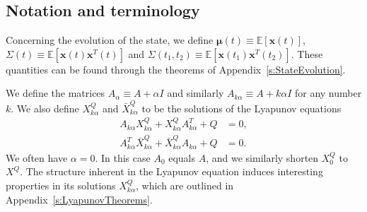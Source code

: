\documentclass[twocolumn]{autart}
\newcommand{\ve}[1]{{\boldsymbol{#1}}} \newcommand{\tr}{\mbox{tr}} \newcommand{\ex}{\mathds{E}} \newcommand{\va}{\mathds{V}}
\begin{document}
\subsection{Notation and terminology} \label{ss:NotationAndTerminology}

Concerning the evolution of the state, we define $\ve{\mu}(t) \equiv \ex[\ve{x}(t)]$, $\Sigma(t) \equiv \ex[\ve{x}(t)\ve{x}^T(t)]$ and $\Sigma(t_1,t_2) \equiv \ex[\ve{x}(t_1)\ve{x}^T(t_2)]$. These quantities can be found through the theorems of Appendix~\ref{s:StateEvolution}.

We define the matrices $A_\alpha \equiv A + \alpha I$ and similarly \mbox{$A_{k\alpha} \equiv A + k\alpha I$} for any number $k$. We also define $X^Q_{k\alpha}$ and $\bar{X}_{k\alpha}^Q$ to be the solutions of the Lyapunov equations
\begin{align}
A_{k\alpha} X_{k\alpha}^Q + X_{k\alpha}^Q A_{k\alpha}^T + Q & = 0, \\
A_{k\alpha}^T \bar{X}_{k\alpha}^Q + \bar{X}_{k\alpha}^Q A_{k\alpha} + Q & = 0.
\end{align}
We often have $\alpha = 0$. In this case $A_0$ equals $A$, and we similarly shorten $X^Q_0$ to $X^Q$. The structure inherent in the Lyapunov equation induces interesting properties in its solutions $X_{k\alpha}^Q$, which are outlined in Appendix~\ref{s:LyapunovTheorems}.
\end{document}
